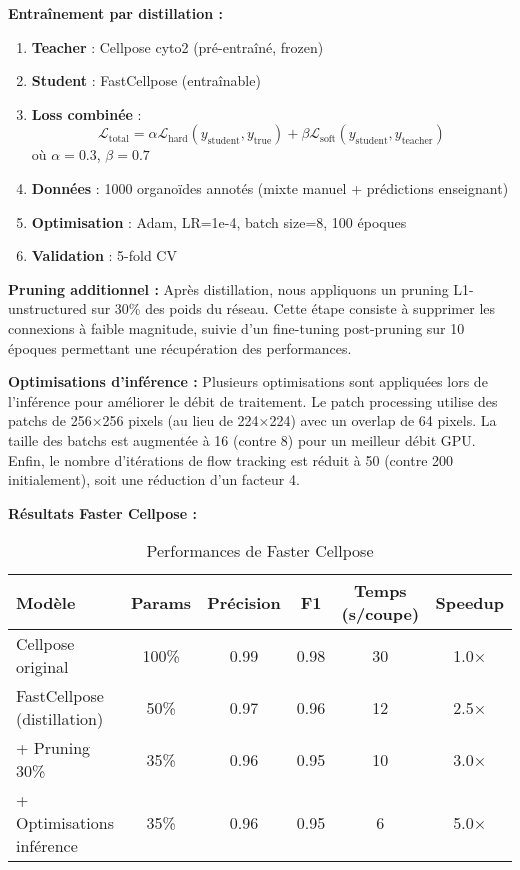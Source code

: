 \textbf{Entraînement par distillation :}
\begin{enumerate}
    \item \textbf{Teacher} : Cellpose cyto2 (pré-entraîné, frozen)
    \item \textbf{Student} : FastCellpose (entraînable)
    \item \textbf{Loss combinée} :
        \[
        \mathcal{L}_{\text{total}} = \alpha \mathcal{L}_{\text{hard}}(y_{\text{student}}, y_{\text{true}}) + \beta \mathcal{L}_{\text{soft}}(y_{\text{student}}, y_{\text{teacher}})
        \]
        où $\alpha = 0.3$, $\beta = 0.7$
    \item \textbf{Données} : 1000 organoïdes annotés (mixte manuel + prédictions enseignant)
    \item \textbf{Optimisation} : Adam, LR=1e-4, batch size=8, 100 époques
    \item \textbf{Validation} : 5-fold CV
\end{enumerate}

\textbf{Pruning additionnel :}
Après distillation, nous appliquons un pruning L1-unstructured sur 30\% des poids du réseau. Cette étape consiste à supprimer les connexions à faible magnitude, suivie d'un fine-tuning post-pruning sur 10 époques permettant une récupération des performances.

\textbf{Optimisations d'inférence :}
Plusieurs optimisations sont appliquées lors de l'inférence pour améliorer le débit de traitement. Le patch processing utilise des patchs de 256×256 pixels (au lieu de 224×224) avec un overlap de 64 pixels. La taille des batchs est augmentée à 16 (contre 8) pour un meilleur débit GPU. Enfin, le nombre d'itérations de flow tracking est réduit à 50 (contre 200 initialement), soit une réduction d'un facteur 4.

\textbf{Résultats Faster Cellpose :}
\begin{table}[h]
\centering
\caption{Performances de Faster Cellpose}
\begin{tabular}{lccccc}
\toprule
\textbf{Modèle} & \textbf{Params} & \textbf{Précision} & \textbf{F1} & \textbf{Temps (s/coupe)} & \textbf{Speedup} \\
\midrule
Cellpose original & 100\% & 0.99 & 0.98 & 30 & 1.0× \\
FastCellpose (distillation) & 50\% & 0.97 & 0.96 & 12 & 2.5× \\
+ Pruning 30\% & 35\% & 0.96 & 0.95 & 10 & 3.0× \\
+ Optimisations inférence & 35\% & 0.96 & 0.95 & 6 & 5.0× \\
\bottomrule
\end{tabular}
\end{table}

